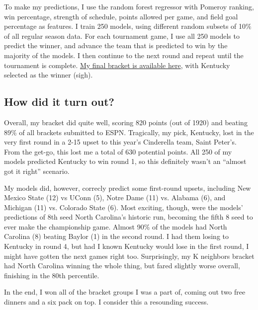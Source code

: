 \documentclass[twocolumn]{aastex63}
\begin{document}
To make my predictions, I use the random forest regressor with Pomeroy ranking, win percentage, strength of schedule, points allowed per game, and field goal percentage as features. 
I train 250 models, using different random subsets of 10\% of all regular season data.
For each tournament game, I use all 250 models to predict the winner, and advance the team that is predicted to win by the majority of the models.
I then continue to the next round and repeat until the tournament is complete.
\href{https://fantasy.espn.com/tournament-challenge-bracket/2022/en/entry?entryID=67523739}{My final bracket is available here}, with Kentucky selected as the winner (sigh).

\subsection{How did it turn out?}
Overall, my bracket did quite well, scoring 820 points (out of 1920) and beating 89\% of all brackets submitted to ESPN.
Tragically, my pick, Kentucky, lost in the very first round in a 2-15 upset to this year's Cinderella team, Saint Peter's.
From the get-go, this lost me a total of 630 potential points.
All 250 of my models predicted Kentucky to win round 1, so this definitely wasn't an ``almost got it right'' scenario.

My models did, however, correcly predict some first-round upsets, including New Mexico State (12) vs UConn (5), Notre Dame (11) vs. Alabama (6), and Michigan (11) vs. Colorado State (6).
Most exciting, though, were the models' predictions of 8th seed North Carolina's historic run, becoming the fifth 8 seed to ever make the championship game.
Almost 90\% of the models had North Carolina (8) beating Baylor (1) in the second round.
I had them losing to Kentucky in round 4, but had I known Kentucky would lose in the first round, I might have gotten the next games right too.
Surprisingly, my K neighbors bracket had North Carolina winning the whole thing, but fared slightly worse overall, finishing in the 80th percentile.

In the end, I won all of the bracket groups I was a part of, coming out two free dinners and a six pack on top.
I consider this a resounding success.
\end{document}
